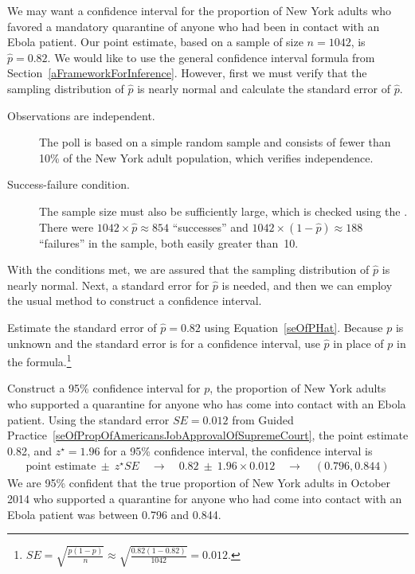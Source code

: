 We may want a confidence interval for the proportion of New York adults who favored a mandatory quarantine of anyone who had been in contact with an Ebola patient. Our point estimate, based on a sample of size $n = 1042$, is $\hat{p} = 0.82$. We would like to use the general confidence interval formula from Section~\ref{aFrameworkForInference}. However, first we must verify that the sampling distribution of $\hat{p}$ is nearly normal and calculate the standard error of $\hat{p}$.
\begin{description}
\item[Observations are independent.] The poll is based on a simple random sample and consists of fewer than 10\% of the New York adult population, which verifies independence.
\item[Success-failure condition.] The sample size must also be sufficiently large, which is checked using the . There were $1042 \times \hat{p} \approx 854$ ``successes'' and $1042 \times (1 - \hat{p}) \approx 188$ ``failures'' in the sample, both easily greater than~10.
\end{description}
With the conditions met, we are assured that the sampling distribution of $\hat{p}$ is nearly normal. Next, a standard error for $\hat{p}$ is needed, and then we can employ the usual method to construct a confidence interval.

\begin{exercise} \label{seOfPropOfAmericansJobApprovalOfSupremeCourt}
Estimate the standard error of $\hat{p} = 0.82$ using Equation~\eqref{seOfPHat}. Because $p$ is unknown and the standard error is for a confidence interval, use $\hat{p}$ in place of $p$ in the formula.\footnote{$SE = \sqrt{\frac{p(1-p)}{n}} \approx \sqrt{\frac{0.82 (1 - 0.82)}{1042}} = 0.012$.}
\end{exercise}

\begin{example}{Construct a 95\% confidence interval for $p$, the proportion of New York adults who supported a quarantine for anyone who has come into contact with an Ebola patient.}
Using the standard error $SE = 0.012$ from Guided Practice~\ref{seOfPropOfAmericansJobApprovalOfSupremeCourt}, the point estimate 0.82, and $z^{\star} = 1.96$ for a 95\% confidence interval, the confidence interval is
\begin{eqnarray*}
\text{point estimate} \ \pm\ z^{\star}SE \quad\to\quad 0.82 \ \pm\ 1.96\times 0.012 \quad\to\quad (0.796, 0.844)
\end{eqnarray*}
We are 95\% confident that the true proportion of New York adults in October 2014 who supported a quarantine for anyone who had come into contact with an Ebola patient was between 0.796 and 0.844.


\end{example}

